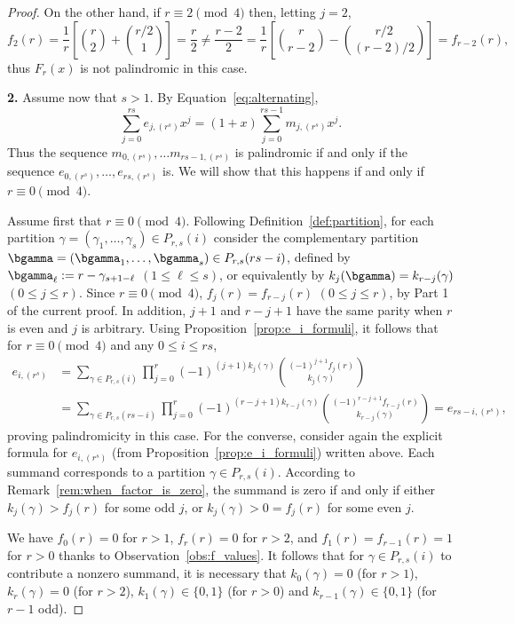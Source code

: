 \begin{proof}
On the other hand, if 
$r\equiv 2 \pmod 4$ then,  
letting $j = 2$,
\[
    f_2(r) 
    = \frac{1}{r} \left[ \binom{r}{2} + \binom{r/2}{1} \right]
    = \frac{r}{2}
    \ne \frac{r-2}{2}
    = \frac{1}{r} \left[ \binom{r}{r-2} - \binom{r/2}{(r-2)/2} \right]
    = f_{r-2}(r),
\]
thus $F_r(x)$ is not palindromic in this case.

{\bf 2.}  
Assume now that $s > 1$.
By Equation~\eqref{eq:alternating}, 
\[
    \sum_{j=0}^{rs} e_{j,(r^s)}x^j
    = (1+x) \sum_{j=0}^{rs-1} m_{j,(r^s)}x^j.
\]
Thus the sequence $m_{0,(r^s)}, \ldots m_{rs-1,(r^s)}$ is palindromic if and only if the sequence $e_{0,(r^s)}, \ldots, e_{rs,(r^s)}$ is.
We will show that this happens if and only if $r \equiv 0 \pmod 4$.

Assume first that $r \equiv 0 \pmod 4$.
Following Definition~\ref{def:partition},
for each partition 
$\gamma  = (\gamma_1, \ldots, \gamma_s) \in P_{r,s}(i)$ 
consider the complementary partition 
$\bgamma = (\bgamma_1, \ldots, \bgamma_s) \in P_{r,s}(rs-i)$, defined by  
$\bgamma_\ell := r-\gamma_{s+1-\ell}$ $(1 \le \ell \le s)$,
or equivalently by
$k_j(\bgamma) = k_{r-j}(\gamma)$ $(0 \le j \le r)$.
Since $r \equiv 0 \pmod 4$,
$f_j(r) = f_{r-j}(r)$ $(0 \le j \le r)$,
by Part 1 of the current proof.
In addition, $j+1$ and $r-j+1$ have the same parity when $r$ is even and $j$ is arbitrary. 
Using Proposition~\ref{prop:e_i_formuli},
it follows that for $r\equiv 0 \pmod 4$ and any $0 \le i \le rs$,
\begin{align*}
    e_{i,(r^s)}
    &= \sum_{\gamma \in P_{r,s}(i)} \prod_{j=0}^{r}
    (-1)^{(j+1)k_j(\gamma)} \binom{(-1)^{j+1} f_j(r)}{k_j(\gamma)} \\
    &= \sum_{\gamma \in P_{r,s}(rs-i)} \prod_{j=0}^{r}
    (-1)^{(r-j+1)k_{r-j}(\gamma)} \binom{(-1)^{r-j+1} f_{r-j}(r)}{k_{r-j}(\gamma)}= e_{rs-i,(r^s)},  
\end{align*}
proving palindromicity in this case. 		
For the converse,
    consider again the explicit formula for $e_{i,(r^s)}$ (from Proposition~\ref{prop:e_i_formuli}) written above. 
    Each summand corresponds to a partition $\gamma \in P_{r,s}(i)$. 
    According to Remark~\ref{rem:when_factor_is_zero}, the summand is zero if and only if either
    $k_j(\gamma) > f_j(r)$ for some odd $j$, or
    $k_j(\gamma) > 0 = f_j(r)$ for some even $j$.
    
       We have
        $f_0(r) = 0$ for $r>1$, 
        $f_r(r) = 0$ for $r>2$, and
        $f_1(r) = f_{r-1}(r) = 1$ for $r>0$ thanks to Observation~\ref{obs:f_values}.
        It follows that for $\gamma \in P_{r,s}(i)$ to contribute a nonzero summand, it is necessary that
        $k_0(\gamma) = 0$ (for $r>1$), 
        $k_r(\gamma) = 0$ (for $r>2$), 
        $k_1(\gamma) \in \{0,1\}$ (for $r>0$) and 
        $k_{r-1}(\gamma) \in \{0,1\}$ (for $r-1$ odd).
        

\end{proof}

